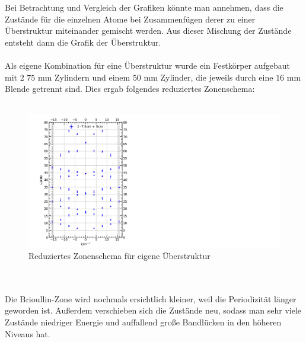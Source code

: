 \documentclass[german,  %
parskip=full,  %
]{scrartcl}
\begin{document}
Bei Betrachtung und Vergleich der Grafiken könnte man annehmen, dass die Zustände für die einzelnen Atome bei Zusammenfügen derer zu einer Überstruktur miteinander gemischt werden. Aus dieser Mischung der Zustände entsteht dann die Grafik der Überstruktur.
\\\\
Als eigene Kombination für eine Überstruktur wurde ein Festkörper aufgebaut mit 2 $75$ mm Zylindern und einem $50$ mm Zylinder, die jeweils durch eine $16$ mm Blende getrennt sind. Dies ergab folgendes reduziertes Zonenschema:
\\\\
\begin{figure}[h!]
\centering
\includegraphics[width=\textwidth]{4633_reduziertes_Zonenschema.png}
\caption{Reduziertes Zonenschema für eigene Überstruktur}
\end{figure}
\\\\
Die Brioullin-Zone wird nochmals ersichtlich kleiner, weil die Periodizität länger geworden ist. Außerdem verschieben sich die Zustände neu, sodass man sehr viele Zustände niedriger Energie und auffallend große Bandlücken in den höheren Niveaus hat. 
\end{document}
